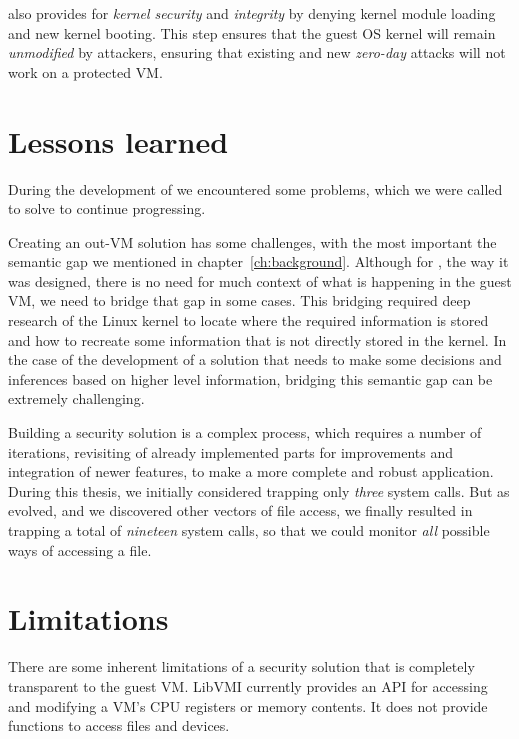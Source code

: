 \par {} also provides for \emph{kernel security} and \emph{integrity} by denying kernel module loading and new kernel booting. This step ensures that the guest \ac{OS} kernel will remain \emph{unmodified} by attackers, ensuring that existing and new \emph{zero-day} attacks will not work on a  protected \ac{VM}. 

\section{Lessons learned}

\par During the development of  we encountered some problems, which we were called to solve to continue progressing.  

\par Creating an out-\ac{VM} solution has some challenges, with the most important the semantic gap we mentioned in chapter~\ref{ch:background}. Although for , the way it was designed, there is no need for much context of what is happening in the guest \ac{VM}, we need to bridge that gap in some cases. This bridging required deep research of the Linux kernel to locate where the required information is stored and how to recreate some information that is not directly stored in the kernel. In the case of the development of a solution that needs to make some decisions and inferences based on higher level information, bridging this semantic gap can be extremely challenging.

\par Building a security solution is a complex process, which requires a number of iterations, revisiting of already implemented parts for improvements and integration of newer features, to make a more complete and robust application. During this thesis, we initially considered trapping only \emph{three} system calls. But as  evolved, and we discovered other vectors of file access, we finally resulted in trapping a total of \emph{nineteen} system calls, so that we could monitor \emph{all} possible ways of accessing a file.

\section{Limitations}

\par There are some inherent limitations of a security solution that is completely transparent to the guest \ac{VM}. LibVMI currently provides an \ac{API} for accessing and modifying a \ac{VM}'s \ac{CPU} registers or memory contents. It does not provide functions to access files and devices. 

